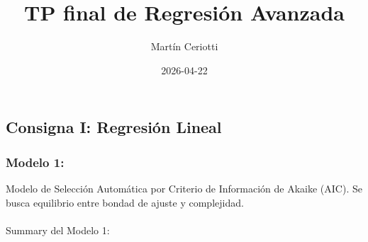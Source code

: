 \documentclass[
  spanish,
  letterpaper,
  DIV=11,
  numbers=noendperiod]{scrartcl}
\title{TP final de Regresión Avanzada}
\author{Martín Ceriotti}
\date{2026-04-22}
\makeatletter
\let\oldparagraph\paragraph
\renewcommand{\paragraph}{
    \@ifstar
      \xxxParagraphStar
      \xxxParagraphNoStar
  }
\newcommand{\xxxParagraphStar}[1]{\oldparagraph*{#1}\mbox{}}
\newcommand{\xxxParagraphNoStar}[1]{\oldparagraph{#1}\mbox{}}
\makeatother
\begin{document}
\maketitle


\subsection{Consigna I: Regresión
Lineal}\label{consigna-i-regresiuxf3n-lineal}

\subsubsection{Modelo 1:}\label{modelo-1}

Modelo de Selección Automática por Criterio de Información de Akaike
(AIC). Se busca equilibrio entre bondad de ajuste y complejidad.

\paragraph{Summary del Modelo 1:}\label{summary-del-modelo-1}
\end{document}

